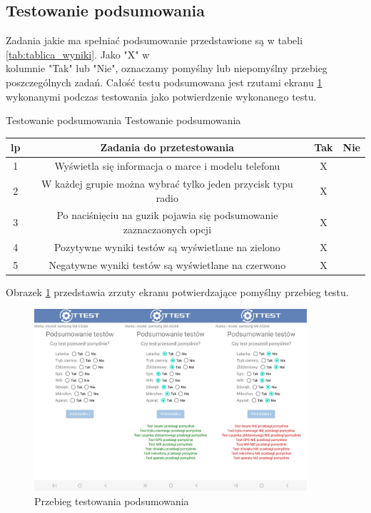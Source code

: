 \newpage


\subsection{Testowanie podsumowania}

Zadania jakie ma spełniać podsumowanie przedstawione są w tabeli \ref{tab:tablica_wyniki}. Jako "X" w \\ kolumnie "Tak" lub "Nie", oznaczamy pomyślny lub niepomyślny przebieg poszczególnych zadań. Całość testu podsumowana jest rzutami ekranu \ref{rys:wyniki} wykonanymi podczas testowania jako potwierdzenie wykonanego testu.

\begin{tabela}
	{Testowanie podsumowania}	%
	{Testowanie podsumowania}	%
	{
		\begin{tabular}{|c|c|c|c|} \hline
			\textbf{lp} & \textbf{Zadania do przetestowania} & \textbf{Tak} & \textbf{Nie} \\ \hline
			1 & Wyświetla się informacja o marce i modelu telefonu & X & ~ \\ \hline
			2 & W każdej grupie można wybrać tylko jeden przycisk typu radio & X & ~ \\ \hline
			3 & Po naciśnięciu na guzik pojawia się podsumowanie zaznaczaonych opcji & X & ~ \\ \hline
			4 & Pozytywne wyniki testów są wyświetlane na zielono & X & ~ \\ \hline
			5 & Negatywne wyniki testów są wyświetlane na czerwono & X & ~ \\ \hline
	\end{tabular}	}
	\label{tab:tablica_wyniki}
\end{tabela}

Obrazek \ref{rys:wyniki} przedstawia zrzuty ekranu potwierdzające pomyślny przebieg testu.

\begin{figure}[!hbt]
	\begin{center}
		\includegraphics[angle=360, width=0.90\textwidth]{rys/punkt5/wyniki.png}
		\caption{Przebieg testowania podsumowania}
		\label{rys:wyniki}
	\end{center}
\end{figure}   

\newpage

